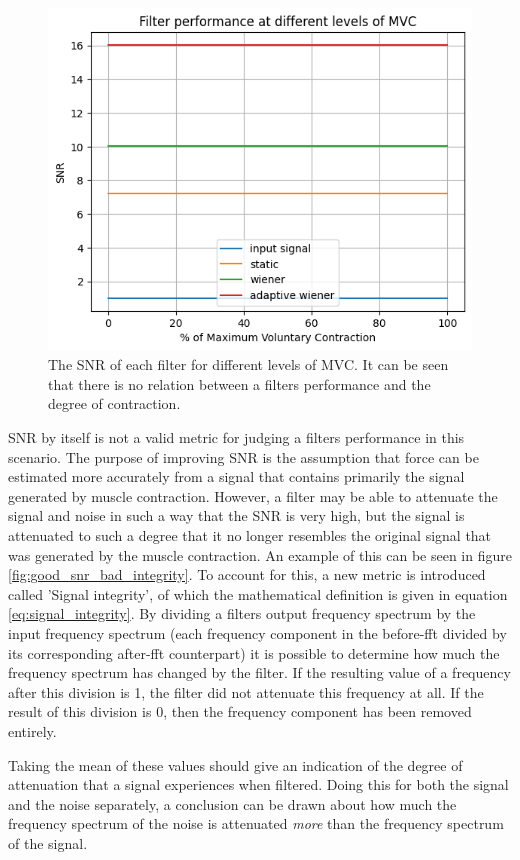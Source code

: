 \begin{figure}[h!t]
	\begin{center}
		\includegraphics[width=0.7\columnwidth]{images/filter_snr_mvc.png}
	\end{center}
	\caption{The SNR of each filter for different levels of MVC. It can be seen that there is no relation between a filters performance and the degree of contraction.}
	\label{fig:filter_snr_mvc}
\end{figure}

SNR by itself is not a valid metric for judging a filters performance in this scenario. The purpose of improving SNR is the assumption that force can be estimated more accurately from a signal that contains primarily the signal generated by muscle contraction. However, a filter may be able to attenuate the signal and noise in such a way that the SNR is very high, but the signal is attenuated to such a degree that it no longer resembles the original signal that was generated by the muscle contraction. An example of this can be seen in figure \ref{fig:good_snr_bad_integrity}. To account for this, a new metric is introduced called 'Signal integrity', of which the mathematical definition is given in equation \ref{eq:signal_integrity}. By dividing a filters output frequency spectrum by the input frequency spectrum (each frequency component in the before-fft divided by its corresponding after-fft counterpart) it is possible to determine how much the frequency spectrum has changed by the filter. If the resulting value of a frequency after this division is 1, the filter did not attenuate this frequency at all. If the result of this division is 0, then the frequency component has been removed entirely. 

Taking the mean of these values should give an indication of the degree of attenuation that a signal experiences when filtered. Doing this for both the signal and the noise separately, a conclusion can be drawn about how much the frequency spectrum of the noise is attenuated \textit{more} than the frequency spectrum of the signal. 

